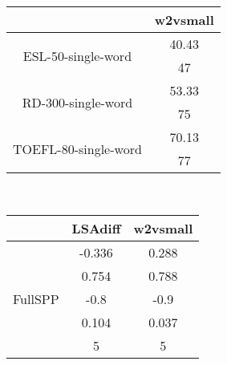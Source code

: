 \documentclass{article}
\begin{document}
\begin{tabular}{cc|}\cline{2-2}
&\multicolumn{1}{|c|}{w2vsmall} \\\hline
\multicolumn{1}{|c|}{\multirow{2}{*}{ESL-50-single-word}} & 40.43 \\
\multicolumn{1}{|c|}{} & 47 \\
\hline
\multicolumn{1}{|c|}{\multirow{2}{*}{RD-300-single-word}} & 53.33 \\
\multicolumn{1}{|c|}{} & 75 \\
\hline
\multicolumn{1}{|c|}{\multirow{2}{*}{TOEFL-80-single-word}} & 70.13 \\
\multicolumn{1}{|c|}{} & 77 \\
\hline
\end{tabular}\\
\begin{tabular}{ccc|}\cline{2-3}
&\multicolumn{1}{|c}{LSAdiff} & w2vsmall \\\hline
\multicolumn{1}{|c|}{\multirow{5}{*}{FullSPP}} & -0.336 & 0.288 \\
\multicolumn{1}{|c|}{} & 0.754 & 0.788 \\
\multicolumn{1}{|c|}{} & -0.8 & -0.9 \\
\multicolumn{1}{|c|}{} & 0.104 & 0.037 \\
\multicolumn{1}{|c|}{} & 5 & 5 \\
\hline
\end{tabular}\\
\end{document}

